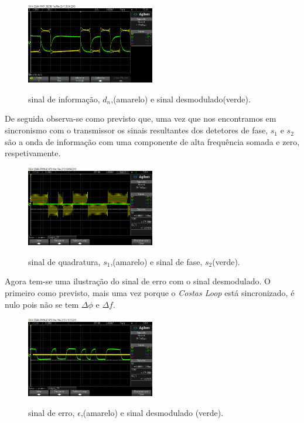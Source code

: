 \documentclass[11pt]{article}
\numberwithin{equation}{section}
\begin{document}
\begin{figure}[H]
	\centering
	\includegraphics[width=0.5\textwidth]{./dn_y1}~\\
	\caption{sinal de informação, $d_n$,(amarelo) e sinal desmodulado(verde).}
	\label{demod}
\end{figure}

De seguida observa-se como previsto que, uma vez que nos encontramos em sincronismo com o transmissor os sinais resultantes dos detetores de fase, $s_1$ e $s_2$ são a onda de informação com uma componente de alta frequência somada e zero, respetivamente.

\begin{figure}[H]
	\centering
	\includegraphics[width=0.5\textwidth]{./s1_s2n}~\\
	\caption{sinal de quadratura, $s_1$,(amarelo) e sinal de fase, $s_2$(verde).}
	\label{s1_s2}
\end{figure}

Agora tem-se uma ilustração do sinal de erro com o sinal desmodulado. O primeiro como previsto, mais uma vez porque o \textit{Costas Loop} está sincronizado, é nulo pois não se tem $\Delta\phi$ e $\Delta f$.

\begin{figure}[H]
	\centering
	\includegraphics[width=0.5\textwidth]{./erro_y1n}~\\
	\caption{sinal de erro, $\epsilon$,(amarelo) e sinal desmodulado (verde).}
	\label{erro_y1n}
\end{figure}
\end{document}
